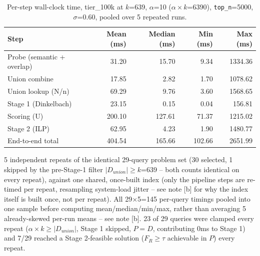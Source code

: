\begin{table}[t]
\centering
\begin{threeparttable}
\caption{Per-step wall-clock time, tier\_100k at $k$=639, $\alpha$=10 ($\alpha{\times}k$=6390), \texttt{top\_n}=5000, $\sigma$=0.60, pooled over 5 repeated runs.}
\label{tab:wdc-step-timing-tier_100k}
\begin{tabular}{lrrrr}
\toprule
Step & Mean (ms)\tnote{a} & Median (ms) & Min (ms) & Max (ms) \\
\midrule
Probe (semantic + overlap) & 31.20 & 15.70 & 9.34 & 1334.36 \\
Union combine & 17.85 & 2.82 & 1.70 & 1078.62 \\
Union lookup (N/n) & 69.29 & 9.76 & 3.60 & 1568.65 \\
\midrule
Stage 1 (Dinkelbach)\tnote{b} & 23.15 & 0.15 & 0.04 & 156.81 \\
Scoring (U) & 200.10 & 127.61 & 71.37 & 1215.02 \\
Stage 2 (ILP)\tnote{b} & 62.95 & 4.23 & 1.90 & 1480.77 \\
End-to-end total & 404.54 & 165.66 & 102.66 & 2651.99 \\
\bottomrule
\end{tabular}
\begin{tablenotes}
\footnotesize
\item[a] 5 independent repeats of the identical 29-query problem set (30 selected, 1 skipped by the pre-Stage-1 filter $|D_{union}|\geq k$=639 -- both counts identical on every repeat), against one shared, once-built index (only the pipeline steps are re-timed per repeat, resampling system-load jitter -- see note [b] for why the index itself is built once, not per repeat). All 29$\times$5=145 per-query timings pooled into one sample before computing mean/median/min/max, rather than averaging 5 already-skewed per-run means -- see note [b]. 23 of 29 queries were clamped every repeat ($\alpha{\times}k \geq |D_{union}|$, Stage 1 skipped, $P=D$, contributing 0ms to Stage 1) and 7/29 reached a Stage 2-feasible solution ($F_R \geq \tau$ achievable in $P$) every repeat.

\end{tablenotes}
\end{threeparttable}
\end{table}
